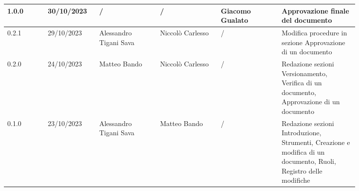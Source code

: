 {\begin{tabular}{p{0.10\linewidth}p{0.10\linewidth}p{0.15\linewidth}p{0.15\linewidth}p{0.15\linewidth}p{0.19\linewidth}}
	  \hline
	  1.0.0             & 30/10/2023    & /                      & /                     & Giacomo Gualato      & Approvazione finale del documento                                                                                                        \\
	  \hline
	  0.2.1             & 29/10/2023    & Alessandro Tigani Sava & Niccolò Carlesso      & /                    & Modifica procedure in sezione Approvazione di un documento                                                                               \\
	  \hline
	  0.2.0             & 24/10/2023    & Matteo Bando           & Niccolò Carlesso      & /                    & Redazione sezioni Versionamento, Verifica di un documento, Approvazione di un documento                                                  \\
	  \hline
	  0.1.0             & 23/10/2023    & Alessandro Tigani Sava & Matteo Bando          & /                    & Redazione sezioni Introduzione, Strumenti, Creazione e modifica di un documento, Ruoli, Registro delle modifiche                         \\
	  \hline
  \end{tabular}
 }
